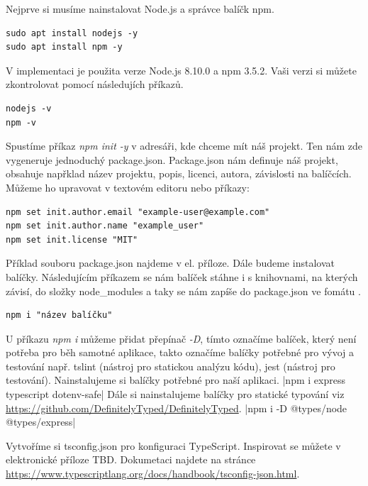 \documentclass[thesis=B,czech]{FITthesis}[2012/06/26]
\begin{document}
        Nejprve si musíme nainstalovat Node.js a správce balíčk npm.
        \begin{verbatim}
sudo apt install nodejs -y
sudo apt install npm -y
    \end{verbatim}
        V implementaci je použita verze Node.js 8.10.0 a npm 3.5.2. Vaši verzi si můžete zkontrolovat pomocí následujích příkazů.
        \begin{verbatim}
nodejs -v
npm -v
        \end{verbatim}
        Spustíme příkaz \textit{npm init -y} v adresáři, kde chceme mít náš projekt. Ten nám zde vygeneruje jednoduchý package.json. Package.json nám definuje náš projekt, obsahuje napřklad název projektu, popis, licenci, autora, závislosti na balíčcích. Můžeme ho upravovat v textovém editoru nebo příkazy:
        \begin{verbatim}
npm set init.author.email "example-user@example.com"
npm set init.author.name "example_user"
npm set init.license "MIT"
        \end{verbatim}
        Příklad souboru package.json najdeme v el. příloze.
        Dále budeme instalovat balíčky. Následujícím příkazem se nám balíček stáhne i s knihovnami, na kterých závisí, do složky node\_modules a taky se nám zapíše do package.json ve fomátu . 
        \begin{verbatim}
npm i "název balíčku"
        \end{verbatim}
        U příkazu \textit{npm i} můžeme přidat přepínač \textit{-D}, tímto označíme balíček, který není potřeba pro běh samotné aplikace, takto označíme balíčky potřebné pro vývoj a testování např. tslint (nástroj pro statickou analýzu kódu), jest (nástroj pro testování).
        Nainstalujeme si balíčky potřebné pro naší aplikaci.
        |npm i express typescript dotenv-safe|
        Dále si nainstalujeme balíčky pro statické typování viz \url{https://github.com/DefinitelyTyped/DefinitelyTyped}.
        |npm i -D @types/node @types/express|
    
        Vytvoříme si tsconfig.json pro konfiguraci TypeScript. Inspirovat se můžete v elektronické příloze TBD. Dokumetaci najdete na stránce \url{https://www.typescriptlang.org/docs/handbook/tsconfig-json.html}.
\end{document}
